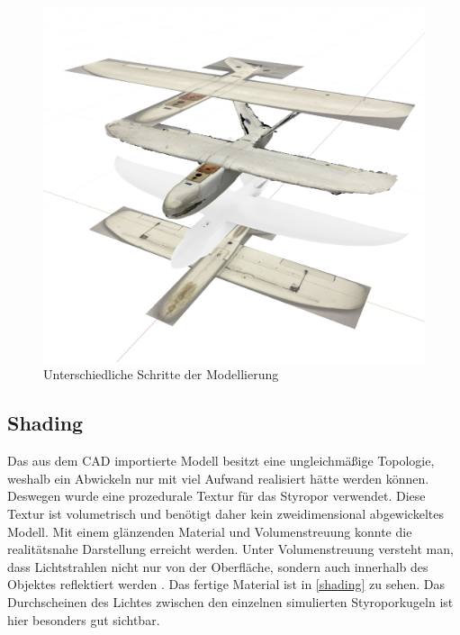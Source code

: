 \begin{figure}[H]
\begin{center}
\includegraphics[width=\textwidth]{gfx/prod/plane/plane5.jpg}
\caption{Unterschiedliche Schritte der Modellierung}
\label{drohne_modell}
\end{center}
\end{figure}
%
\subsection{Shading}

Das aus dem CAD importierte Modell besitzt eine ungleichmäßige Topologie, weshalb ein Abwickeln nur mit viel Aufwand realisiert hätte werden können. Deswegen wurde eine prozedurale Textur für das Styropor verwendet. Diese Textur ist volumetrisch und benötigt daher kein zweidimensional abgewickeltes Modell. Mit einem glänzenden Material und Volumenstreuung konnte die realitätsnahe Darstellung erreicht werden. Unter Volumenstreuung versteht man, dass Lichtstrahlen nicht nur von der Oberfläche, sondern auch innerhalb des Objektes reflektiert werden . Das fertige Material ist in \autoref{shading} zu sehen. Das Durchscheinen des Lichtes zwischen den einzelnen simulierten Styroporkugeln ist hier besonders gut sichtbar.

